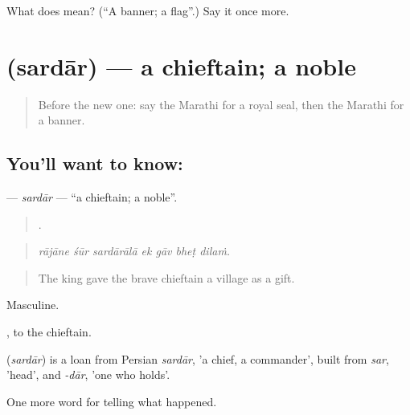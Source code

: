 \begin{tcolorbox}[breakable,colback=teal!4,colframe=teal!35!black,title={Before you move on}]
What does  mean? (\textquotedblleft{}A banner; a flag\textquotedblright{}.) Say it once more.
\end{tcolorbox}
\section[\texorpdfstring{\mr{सरदार} (sardār)}{सरदार (sardār)}]{ (sardār) — a chieftain; a noble}

\label{lesson:MR-C327-sardar}



\begin{quote}
Before the new one: say the Marathi for a royal seal, then the Marathi for a banner.
\end{quote}

\subsection*{You'll want to know: }
\textbf{} — \emph{sardār} — \textquotedblleft{}a chieftain; a noble\textquotedblright{}.

\begin{quote}
      .
\end{quote}

\begin{quote}
\emph{rājāne śūr sardārālā ek gāv bheṭ dilaṁ.}
\end{quote}

\begin{quote}
The king gave the brave chieftain a village as a gift.
\end{quote}

Masculine.

, to the chieftain.

\begin{cousinweb}
\textbf{} (\emph{sardār}) is a loan from Persian \emph{sardār}, 'a chief, a commander', built from \emph{sar}, 'head', and \emph{-dār}, 'one who holds'.
\end{cousinweb}

\begin{grammarlens}[title={What you've built}]
One more word for telling what happened.
\end{grammarlens}


